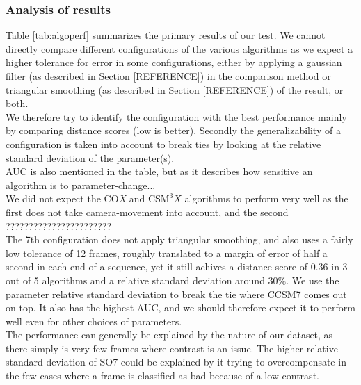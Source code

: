 \subsubsection{Analysis of results}
%
Table \ref{tab:algoperf} summarizes the primary results of our test. We cannot directly compare different configurations of the various algorithms as we expect a higher tolerance for error in some configurations, either by applying a gaussian filter (as described in Section [REFERENCE]) in the comparison method or triangular smoothing (as described in Section [REFERENCE]) of the result, or both.\\
We therefore try to identify the configuration with the best performance mainly by comparing distance scores (low is better). Secondly the generalizability of a configuration is taken into account to break ties by looking at the relative standard deviation of the parameter(s).\\
AUC is also mentioned in the table, but as it describes how sensitive an algorithm is to parameter-change...\\
We did not expect the CO\textit{X} and $\text{CSM}^{3}\textit{X}$ algorithms to perform very well as the first does not take camera-movement into account, and the second ???????????????????????\\
The 7th configuration does not apply triangular smoothing, and also uses a fairly low tolerance of 12 frames, roughly translated to a margin of error of half a second in each end of a sequence, yet it still achives a distance score of $0.36$ in 3 out of 5 algorithms and a relative standard deviation around $30\%$. We use the parameter relative standard deviation to break the tie where CCSM7 comes out on top. It also has the highest AUC, and we should therefore expect it to perform well even for other choices of parameters.\\
The performance can generally be explained by the nature of our dataset, as there simply is very few frames where contrast is an issue. The higher relative standard deviation of SO7 could be explained by it trying to overcompensate in the few cases where a frame is classified as bad because of a low contrast.
%
